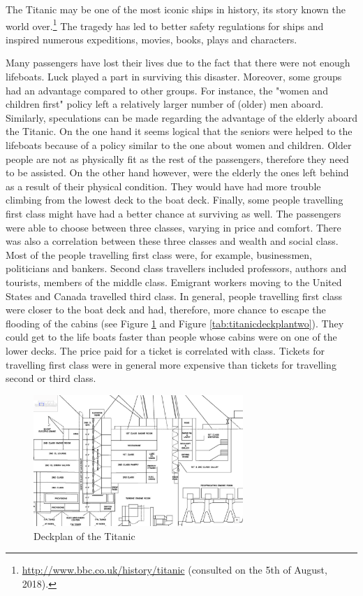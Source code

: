 \documentclass[11pt]{article}
\begin{document}
The Titanic may be one of the most iconic ships in history, its story known the world over.\footnote{\url{http://www.bbc.co.uk/history/titanic} (consulted on the 5th of August, 2018).} The tragedy has led to better safety regulations for ships and inspired numerous expeditions, movies, books, plays and characters.

Many passengers have lost their lives due to the fact that there were not enough lifeboats. Luck played a part in surviving this disaster. Moreover, some groups had an advantage compared to other groups. For instance, the "women and children first" policy left a relatively larger number of (older) men aboard. Similarly, speculations can be made regarding the advantage of the elderly aboard the Titanic. On the one hand it seems logical that the seniors were helped to the lifeboats because of a policy similar to the one about women and children. Older people are not as physically fit as the rest of the passengers, therefore they need to be assisted. On the other hand however, were the elderly the ones left behind as a result of their physical condition. They would have had more trouble climbing from the lowest deck to the boat deck. Finally, some people travelling first class might have had a better chance at surviving as well. The passengers were able to choose between three classes, varying in price and comfort. There was also a correlation between these three classes and wealth and social class. Most of the people travelling first class were, for example, businessmen, politicians and bankers. Second class travellers included professors, authors and tourists, members of the middle class. Emigrant workers moving to the United States and Canada travelled third class. In general, people travelling first class were closer to the boat deck and had, therefore, more chance to escape the flooding of the cabins (see Figure \ref{tab:titanicdeckplanone} and Figure \ref{tab:titanicdeckplantwo}). They could get to the life boats faster than people whose cabins were on one of the lower decks. The price paid for a ticket is correlated with class. Tickets for travelling first class were in general more expensive than tickets for travelling second or third class. 

\begin{figure}[htbp]
\centering
\includegraphics[width=300px]{./Deck2.png}
\caption{\label{tab:titanicdeckplanone}
Deckplan of the Titanic}
\end{figure} 
\end{document}
